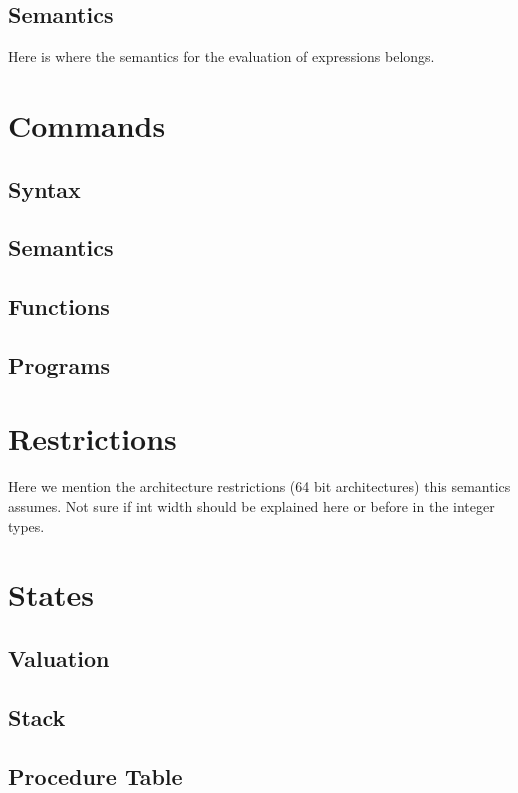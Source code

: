 \subsection{Semantics}

Here is where the semantics for the evaluation of expressions belongs.

\section{Commands}

\subsection{Syntax}

\subsection{Semantics}

\subsection{Functions}
\subsection{Programs}

\section{Restrictions}

Here we mention the architecture restrictions (64 bit architectures) this semantics assumes.
Not sure if int width should be explained here or before in the integer types.

\section{States}

\subsection{Valuation}
\subsection{Stack}
\subsection{Procedure Table}

